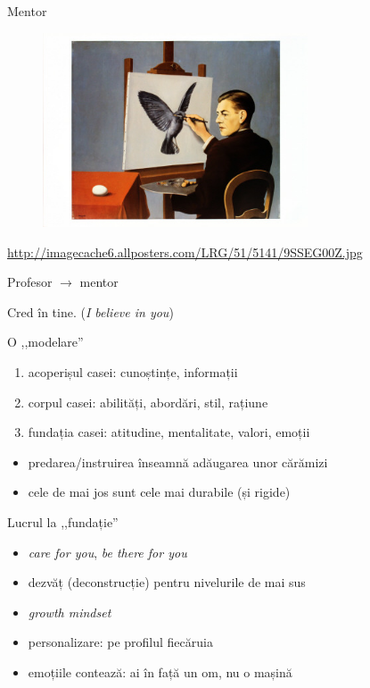 \documentclass{beamer}
\begin{document}
\begin{frame}{Mentor}
  \begin{figure}
    \centering
    \includegraphics[width=0.7\textwidth]{img/egg-painter}
  \end{figure}
  \begin{center}
    \scriptsize
    \url{http://imagecache6.allposters.com/LRG/51/5141/9SSEG00Z.jpg}
  \end{center}
\end{frame}

\begin{frame}{Profesor $\rightarrow$ mentor}
  \begin{center}
    Cred în tine. (\textit{I believe in you})
  \end{center}
\end{frame}

\begin{frame}{O ,,modelare''}
  \begin{enumerate}
    \pause
    \item acoperișul casei: cunoștințe, informații
    \pause
    \item corpul casei: abilități, abordări, stil, rațiune
    \pause
    \item fundația casei: atitudine, mentalitate, valori, emoții
  \end{enumerate}
  \begin{itemize}
    \pause
    \item predarea/instruirea înseamnă adăugarea unor cărămizi
    \pause
    \item cele de mai jos sunt cele mai durabile (și rigide)
  \end{itemize}
\end{frame}

\begin{frame}{Lucrul la ,,fundație''}
  \begin{itemize}
    \pause
    \item \textit{care for you}, \textit{be there for you}
    \pause
    \item dezvăț (deconstrucție) pentru nivelurile de mai sus
    \pause
    \item \textit{growth mindset}
    \pause
    \item personalizare: pe profilul fiecăruia
    \pause
    \item emoțiile contează: ai în față un om, nu o mașină
  \end{itemize}
\end{frame}
\end{document}
